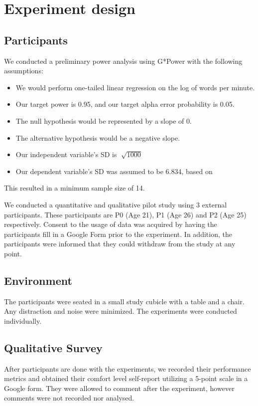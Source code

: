 \section{Experiment design}

\subsection{Participants}

 We conducted a preliminary power analysis using G*Power with the following assumptions: 
\begin{itemize}
	\item We would perform one-tailed linear regression on the log of words per minute.
	\item Our target power is 0.95, and our target alpha error probability is 0.05.
	\item The null hypothesis would be represented by a slope of 0.
	\item The alternative hypothesis would be a negative slope. 
	\item Our independent variable's SD is $\sqrt[]{1000}$
	\item Our dependent variable's SD was assumed to be 6.834, based on \citep{akpinar2023effect}
\end{itemize}
This resulted in a minimum sample size of 14. 

We conducted a quantitative and qualitative pilot study using 3 external participants.
These participants are P0 (Age 21), P1 (Age 26) and P2 (Age 25) respectively.
Consent to the usage of data was acquired by having the participants fill in a Google Form prior to the experiment.
In addition, the participants were informed that they could withdraw from the study at any point.

\subsection{Environment}

The participants were seated in a small study cubicle with a table and a chair.
Any distraction and noise were minimized. The experiments were conducted individually. 

\subsection{Qualitative Survey}

After participants are done with the experiments, we recorded their performance metrics and obtained their comfort level self-report utilizing a 5-point scale in a Google form.
They were allowed to comment after the experiment, however comments were not recorded nor analysed.

